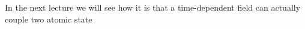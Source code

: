 In the next lecture we will see how it is that a time-dependent field can actually couple two atomic state